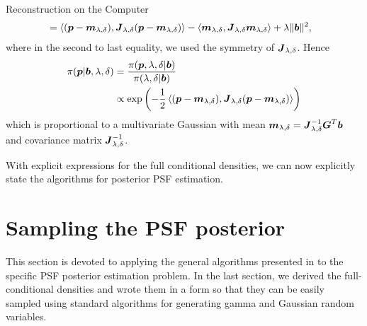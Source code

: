 \begin{chapter}{Reconstruction on the Computer}
\begin{align}
  &= \left\langle (\mbox{\boldmath$p$}-\mbox{\boldmath$m$}_{\lambda,\delta}),\mbox{\boldmath$J$}_{\lambda,\delta}(\mbox{\boldmath$p$} - \mbox{\boldmath$m$}_{\lambda,\delta})\right \rangle - \langle \mbox{\boldmath$m$}_{\lambda,\delta},\mbox{\boldmath$J$}_{\lambda,\delta}\mbox{\boldmath$m$}_{\lambda,\delta}\rangle + \lambda \|\mbox{\boldmath$b$}\|^2, \label{eq:completingSquare}
\end{align}
where in the second to last equality, we used the symmetry of $\mbox{\boldmath$J$}_{\lambda,\delta}$.
Hence 
\begin{align}
  \pi(\mbox{\boldmath$p$}|\mbox{\boldmath$b$},\lambda,\delta) 
    &= \frac{\pi(\mbox{\boldmath$p$},\lambda,\delta|\mbox{\boldmath$b$})}{\pi(\lambda,\delta|\mbox{\boldmath$b$}) } \nonumber\\
    &\propto \exp\left(-\frac 12\left\langle (\mbox{\boldmath$p$}-\mbox{\boldmath$m$}_{\lambda,\delta}),\mbox{\boldmath$J$}_{\lambda,\delta}(\mbox{\boldmath$p$} - \mbox{\boldmath$m$}_{\lambda,\delta})\right \rangle\right)\label{eq:gaussianLikelihood}
\end{align}
which is proportional to a multivariate Gaussian with mean $\mbox{\boldmath$m$}_{\lambda,\delta} = \mbox{\boldmath$J$}_{\lambda,\delta}^{-1}\mbox{\boldmath$G$}^T \mbox{\boldmath$b$}$ and covariance matrix $\mbox{\boldmath$J$}_{\lambda,\delta}^{-1}$.

With explicit expressions for the full conditional densities, we can now explicitly state the algorithms for posterior PSF estimation.

\section{Sampling the PSF posterior}

This section is devoted to applying the general algorithms presented in  to the specific PSF posterior estimation problem.  
In the last section, we derived the full-conditional densities and wrote them in a form so that they can be easily sampled using standard algorithms for generating gamma and Gaussian random variables.


\end{chapter}

